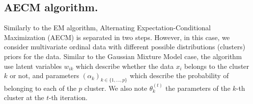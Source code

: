 \subsection{AECM algorithm.} 
\label{sec:aecm}

Similarly to the EM algorithm, Alternating Expectation-Conditional Maximization (AECM) \citep{meng1997algorithm} is separated in two steps. However, in this case, we consider multivariate ordinal data with different possible distributions (clusters) priors for the data. Similar to the Gaussian Mixture Model case, the algorithm use latent variables $w_{ik}$ which describe whether the data $x_i$ belongs to the cluster $k$ or not, and parameters $(\alpha_k)_{k\in \{1, \ldots, p\}}$ which describe the probability of belonging to each of the $p$ cluster. We also note $\theta_k^{(t)}$ the parameters of the $k$-th cluster at the $t$-th iteration.
